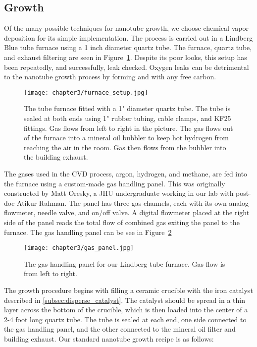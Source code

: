 \subsection{Growth}
\label{subsubsec:powder_cvd}

Of the many possible techniques for nanotube growth, we choose chemical vapor deposition for its simple implementation. The process is carried out in a Lindberg Blue tube furnace using a 1 inch diameter quartz tube. The furnace, quartz tube, and exhaust filtering are seen in Figure~\ref{fig:furnace_setup}. Despite its poor looks, this setup has been repeatedly, and successfully, leak checked. Oxygen leaks can be detrimental to the nanotube growth process by forming  and  with any free carbon.

\begin{figure}
    \centering
    \texttt{[image: chapter3/furnace\_setup.jpg]}
    \caption{The tube furnace fitted with a 1" diameter quartz tube. The tube is sealed at both ends using 1" rubber tubing, cable clamps, and KF25 fittings. Gas flows from left to right in the picture. The gas flows out of the furnace into a mineral oil bubbler to keep hot hydrogen from reaching the air in the room. Gas then flows from the bubbler into the building exhaust.}
    \label{fig:furnace_setup}
\end{figure}

The gases used in the CVD process, argon, hydrogen, and methane, are fed into the furnace using a custom-made gas handling panel. This was originally constructed by Matt Oresky, a JHU undergraduate working in our lab with post-doc Atikur Rahman. The panel has three gas channels, each with its own analog flowmeter, needle valve, and on/off valve. A digital flowmeter placed at the right side of the panel reads the total flow of combined gas exiting the panel to the furnace. The gas handling panel can be see in Figure~\ref{fig:gas_panel}

\begin{figure}
    \centering
    \texttt{[image: chapter3/gas\_panel.jpg]}
    \caption{The gas handling panel for our Lindberg tube furnace. Gas flow is from left to right.}
    \label{fig:gas_panel}
\end{figure}

The growth procedure begins with filling a ceramic crucible with the iron catalyst described in \ref{subsec:disperse_catalyst}. The catalyst should be spread in a thin layer across the bottom of the crucible, which is then loaded into the center of a 2-4 foot long quartz tube. The tube is sealed at each end, one side connected to the gas handling panel, and the other connected to the mineral oil filter and building exhaust. Our standard nanotube growth recipe is as follows: 

